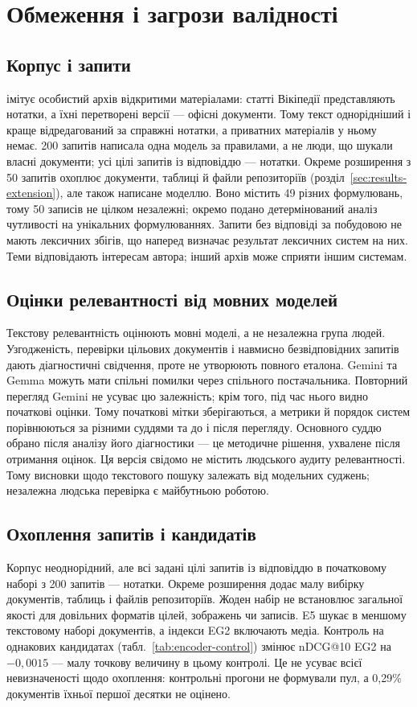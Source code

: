\section{Обмеження і загрози валідності}\label{sec:limitations}

\subsection{Корпус і запити}
\uapar{} імітує особистий архів відкритими матеріалами: статті Вікіпедії представляють нотатки, а їхні перетворені версії --- офісні документи. Тому текст однорідніший і краще відредагований за справжні нотатки, а приватних матеріалів у ньому немає. 200 запитів написала одна модель за правилами, а не люди, що шукали власні документи; усі цілі запитів із відповіддю --- нотатки. Окреме розширення з 50 запитів охоплює документи, таблиці й файли репозиторіїв (розділ~\ref{sec:results-extension}), але також написане моделлю. Воно містить 49 різних формулювань, тому 50 записів не цілком незалежні; окремо подано детермінований аналіз чутливості на унікальних формулюваннях. Запити без відповіді за побудовою не мають лексичних збігів, що наперед визначає результат лексичних систем на них. Теми відповідають інтересам автора; інший архів може сприяти іншим системам.

\subsection{Оцінки релевантності від мовних моделей}
Текстову релевантність оцінюють мовні моделі, а не незалежна група людей. Узгодженість, перевірки цільових документів і навмисно безвідповідних запитів дають діагностичні свідчення, проте не утворюють повного еталона. Gemini та Gemma можуть мати спільні помилки через спільного постачальника. Повторний перегляд Gemini не усуває цю залежність; крім того, під час нього видно початкові оцінки. Тому початкові мітки зберігаються, а метрики й порядок систем порівнюються за різними суддями та до і після перегляду. Основного суддю обрано після аналізу його діагностики --- це методичне рішення, ухвалене після отримання оцінок. Ця версія свідомо не містить людського аудиту релевантності. Тому висновки щодо текстового пошуку залежать від модельних суджень; незалежна людська перевірка є майбутньою роботою.

\subsection{Охоплення запитів і кандидатів}
Корпус неоднорідний, але всі задані цілі запитів із відповіддю в початковому наборі з 200 запитів --- нотатки. Окреме розширення додає малу вибірку документів, таблиць і файлів репозиторіїв. Жоден набір не встановлює загальної якості для довільних форматів цілей, зображень чи записів. E5 шукає в меншому текстовому наборі документів, а індекси EG2 включають медіа. Контроль на однакових кандидатах (табл.~\ref{tab:encoder-control}) змінює nDCG@10 EG2 на $-0{,}0015$ --- малу точкову величину в цьому контролі. Це не усуває всієї невизначеності щодо охоплення: контрольні прогони не формували пул, а 0,29\% документів їхньої першої десятки не оцінено.

